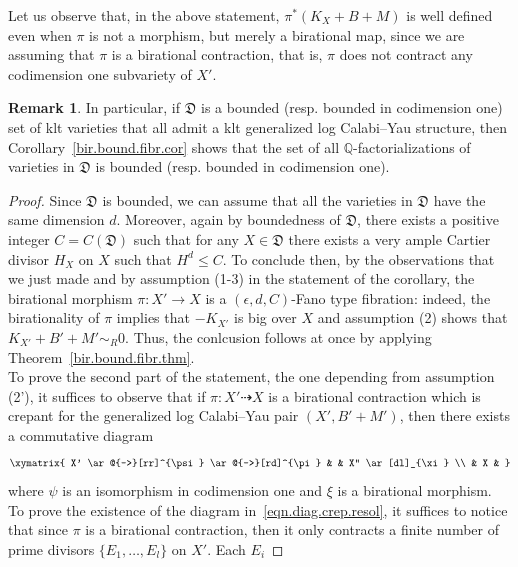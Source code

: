 \documentclass[11pt]{ip-journal}
\theoremstyle{definition}
\newtheorem{remark}[theorem]{Remark}
\begin{document}
Let us observe that, in the above statement,
$\pi^\ast(K_{X}+B+M)$ 
is well defined even when 
$\pi$ 
is not a morphism, but merely a birational map, since we are assuming that 
$\pi$ 
is a birational contraction, that is, 
$\pi$ 
does not contract any codimension one subvariety of 
$X'$. 

\begin{remark}
\label{rmk.q-factor.bound}
In particular, if
$\mathfrak D$
is a bounded (resp. bounded in codimension one) set of klt varieties that all admit a klt generalized log Calabi--Yau structure,
then Corollary~\ref{bir.bound.fibr.cor} shows that the set of 
all $\mathbb Q$-factorializations 
of varieties in 
$\mathfrak D$
is bounded (resp. bounded in codimension one).
\end{remark}


\begin{proof}
Since 
$\mathfrak D$ 
is bounded, 
we can assume that all the varieties in 
$\mathfrak D$
have the same dimension 
$d$.
Moreover, again by boundedness of
$\mathfrak D$,
there exists a positive integer 
$C=C(\mathfrak D)$
such that for any 
$X \in \mathfrak D$
there exists a very ample Cartier divisor
$H_X$ 
on 
$X$
such that
$H^d \leq C$.
To conclude then, by the observations that we just made and by assumption (1-3) in the statement of the corollary, 
the birational morphism 
$\pi \colon X' \to X$ 
is a
$(\epsilon, d, C)$-Fano 
type fibration: 
indeed, the birationality of $\pi$ implies that 
$-K_{X'}$ 
is big over 
$X$
and assumption (2) shows that 
$K_{X'}+B'+M' \sim_{R} 0$.
Thus, the conlcusion follows at once by applying Theorem~\ref{bir.bound.fibr.thm}.
\\
To prove the second part of the statement, the one depending from assumption 
(2'), 
it suffices to observe that if 
$\pi \colon X' \dashrightarrow X$
is a birational contraction which is crepant for the generalized log Calabi--Yau pair 
$(X', B'+M')$, 
then there exists a commutative diagram
\begin{align}
\label{eqn.diag.crep.resol}
    \xymatrix{
X' \ar@{-->}[rr]^{\psi} \ar@{-->}[rd]^{\pi} 
&
&
X'' \ar[dl]_{\xi} \\
&
X
&   }
\end{align}
where 
$\psi$ 
is an isomorphism in codimension one and 
$\xi$
is a birational morphism.
To prove the existence of the diagram in~\eqref{eqn.diag.crep.resol}, it suffices to notice that since $\pi$ is a birational contraction, then it only contracts a finite number of prime divisors 
$\{E_1, \dots, E_l\}$
on 
$X'$.
Each
$E_i$

\end{proof}
\end{document}
